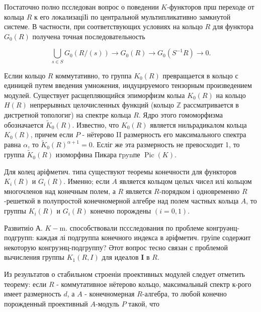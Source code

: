 \documentclass[10pt]{article}
\begin{document}
Постаточно полно псследован вопрос о поведении $K$-функторов прш переходе от кольца $R$ к его локализаціІі по центральной мультипликативно замкнутой системе. В частности, при соответствующих условиях на кольцо $R$ для функтора $G_{0}(R)$ получена точная последовательность



\[

\bigcup_{s \in S} G_{0}(R /(s)) \longrightarrow G_{0}(R) \longrightarrow G_{0}\left(S^{-1} R\right) \longrightarrow 0 .

\]



Еслии кольцо $R$ коммутативно, то группа $K_{0}(R)$ превращается в кольцо с единицей путем введения умножения, индуцируемого тензорным произведением модулей. Существует расщепляющийся эпиморфизм колыа $K_{0}(R)$ на кольцо $H(R)$ непрерывных целочисленных функций (кольцо $\mathbb{Z}$ рассматривается в дистретной топологиг) на спектре кольца $R$. Ядро этого гомоморфизма обозначается $\tilde{K}_{0}(R)$. Известно, что $K_{0}(R)$ является нильрадикалом кольца $K_{0}(R)$, причем если $P$ - нётерово II размерность его максимального спектра равна $\alpha$, то $\widetilde{K}_{0}(R)^{\alpha+1}=0$. Есліг же эта размерность не превосходит 1, то группа $\widetilde{K}_{0}(R)$ изоморфина Пикара гpynпе $\operatorname{Pic}(K)$.



Для колец аріфметич. типа существуют теоремы конечности для функторов $K_{i}(R)$ и $G_{i}(R)$. Именно; если $A$ является кольцом целых чисел илі кольцом многочленов над конечным полем, а $R$ является $R$-порядком і одновременно $R$-решеткой в полупростой конечномерной алгебре над полем частных кольца $A$, то группы $K_{i}(R)$ и $G_{i}(R)$ конечно порождены $(i=0,1)$.



Развитиіо А. $K-\mathrm{m}$. способствовали пссследования по проблеме конгруәнц-подгрупп: каждая лі подгруппа конечного индекса в аріфметич. груіпе содержит некоторую конгруэнц-подгруппу? Әтот вопрос тесно связан с проблемой вычисления группы $K_{1}(R, I)$ для идеалов $\boldsymbol{I}$ в $R$.



Из результатов о стабильном строеніи проективных модулей следует отметить теорему: если $R$ - коммутативное нётерово кольцо, максимальный спектр к-рого имеет размерность $d$, а $A$ - конечномерная $R$-алгебра, то любой конечно порожденный проективный $A$-модуль $P$ такой, что
\end{document}
